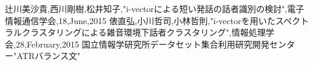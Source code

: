 \begin{thebibliography}{99}     %
辻川美沙貴,西川剛樹,松井知子,"i-vectorによる短い発話の話者識別の検討",電子情報通信学会,18,June,2015
俵直弘,小川哲司,小林哲則,"i-vectorを用いたスペクトラルクラスタリングによる雑音環境下話者クラスタリング",情報処理学会,28,February,2015
国立情報学研究所データセット集合利用研究開発センター"ATRバランス文"
\end{thebibliography}
